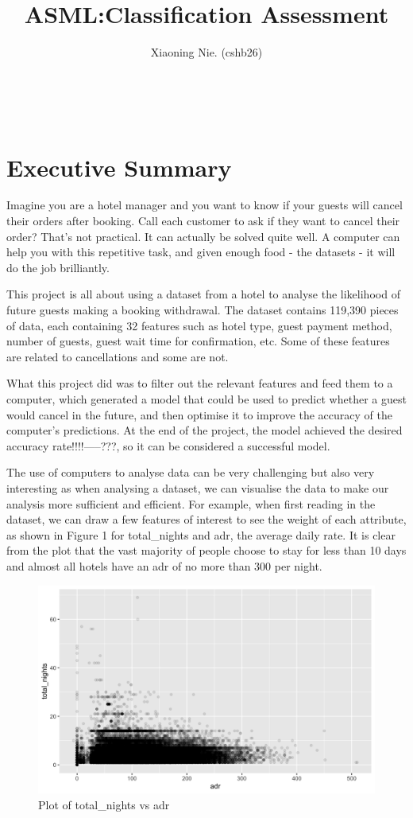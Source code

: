 \documentclass{article}
\title{ASML:Classification Assessment}
\author{Xiaoning Nie. (cshb26)}
\begin{document}
\maketitle

\ 


\section{Executive Summary}

Imagine you are a hotel manager and you want to know if your guests will cancel their orders after booking. Call each customer to ask if they want to cancel their order? That's not practical. It can actually be solved quite well. A computer can help you with this repetitive task, and given enough food - the datasets - it will do the job brilliantly.

This project is all about using a dataset from a hotel to analyse the likelihood of future guests making a booking withdrawal. The dataset contains 119,390 pieces of data, each containing 32 features such as hotel type, guest payment method, number of guests, guest wait time for confirmation, etc. Some of these features are related to cancellations and some are not.	

What this project did was to filter out the relevant features and feed them to a computer, which generated a model that could be used to predict whether a guest would cancel in the future, and then optimise it to improve the accuracy of the computer's predictions. At the end of the project, the model achieved the desired accuracy rate!!!!-----???, so it can be considered a successful model.

The use of computers to analyse data can be very challenging but also very interesting as when analysing a dataset, we can visualise the data to make our analysis more sufficient and efficient. For example, when first reading in the dataset, we can draw a few features of interest to see the weight of each attribute, as shown in Figure 1 for total\_nights and adr, the average daily rate. It is clear from the plot that the vast majority of people choose to stay for less than 10 days and almost all hotels have an adr of no more than 300 per night.

\begin{figure}[h]
\centering
\includegraphics[width=12cm]{nightadr.png} %
\caption{Plot of total\_nights vs adr} %
\end{figure}
\end{document}
